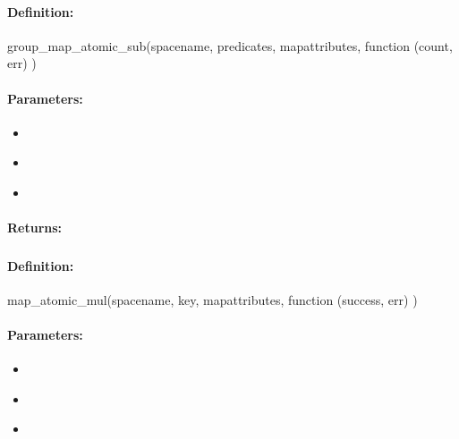 \paragraph{Definition:}
\begin{javascriptcode}
group_map_atomic_sub(spacename, predicates, mapattributes, function (count, err) {})
\end{javascriptcode}
\paragraph{Parameters:}
\begin{itemize}[noitemsep]
\item {}\\

\item {}\\

\item {}\\

\end{itemize}

\paragraph{Returns:}


\pagebreak
\subsubsection{}
\label{api:nodejs:map_atomic_mul}


\paragraph{Definition:}
\begin{javascriptcode}
map_atomic_mul(spacename, key, mapattributes, function (success, err) {})
\end{javascriptcode}
\paragraph{Parameters:}
\begin{itemize}[noitemsep]
\item {}\\

\item {}\\

\item {}\\

\end{itemize}

